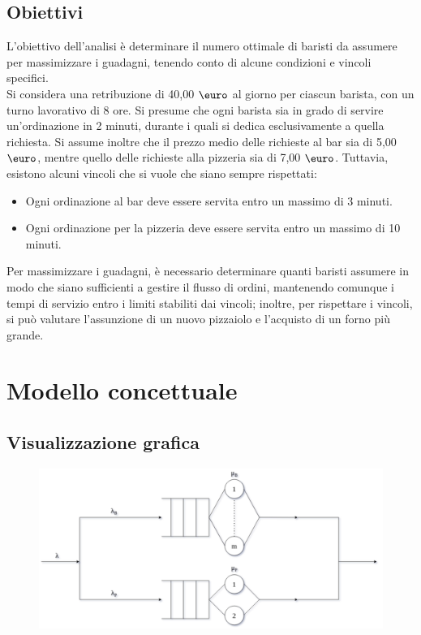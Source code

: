 \documentclass[a4paper, 12pt]{article}
\begin{document}
\bigskip

\subsection{Obiettivi}
L'obiettivo dell'analisi è determinare il numero ottimale di baristi da assumere per massimizzare i guadagni, tenendo conto di alcune condizioni e vincoli specifici.\\

Si considera una retribuzione di 40,00 $\mbox{\euro}$ al giorno per ciascun barista, con un turno lavorativo di 8 ore. Si presume che ogni barista sia in grado di servire un'ordinazione in 2 minuti, durante i quali si dedica esclusivamente a quella richiesta. Si assume inoltre che il prezzo medio delle richieste al bar sia di 5,00 $\mbox{\euro}$, mentre quello delle richieste alla pizzeria sia di 7,00 $\mbox{\euro}$. Tuttavia, esistono alcuni vincoli che si vuole che siano sempre rispettati:
\begin{itemize}
\item Ogni ordinazione al bar deve essere servita entro un massimo di 3 minuti.
\item Ogni ordinazione per la pizzeria deve essere servita entro un massimo di 10 minuti.
\end{itemize}

Per massimizzare i guadagni, è necessario determinare quanti baristi assumere in modo che siano sufficienti a gestire il flusso di ordini, mantenendo comunque i tempi di servizio entro i limiti stabiliti dai vincoli; inoltre, per rispettare i vincoli, si può valutare l'assunzione di un nuovo pizzaiolo e l'acquisto di un forno più grande.

\section{Modello concettuale}
\subsection{Visualizzazione grafica}
\begin{figure}[H]
\centering
\includegraphics[width=\textwidth]{conceptual_model}
\end{figure}
\end{document}
